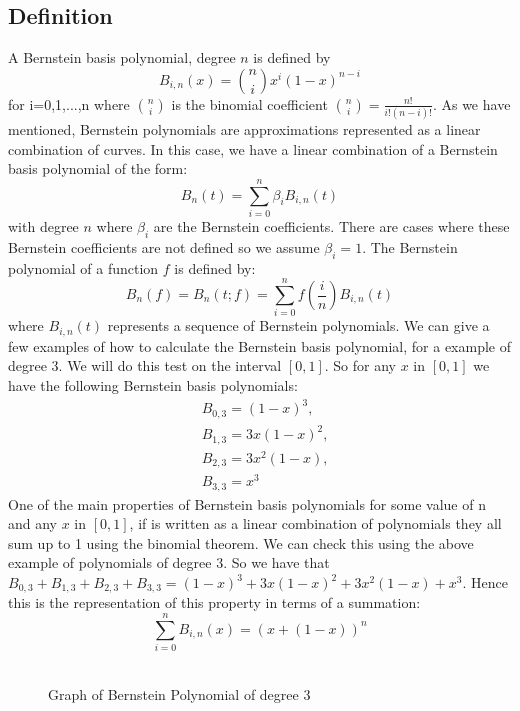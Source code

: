 \documentclass{article}
\begin{document}
\subsection{Definition}
A Bernstein basis polynomial, degree $n$ is defined by
\begin{equation}
 B_{i,n}(x)=\binom{n}{i}x^i(1-x)^{n-i} 
\end{equation}
for i=0,1,...,n where $\binom{n}{i}$ is the binomial coefficient $\binom{n}{i}=\frac{n!}{i!(n-i)!}$.
As we have mentioned, Bernstein polynomials are approximations represented as a linear combination of curves. In this case, we have a linear combination of a Bernstein basis polynomial of the form:
\begin{equation}
B_n(t)=\sum_{i=0}^{n}\beta_iB_{i,n}(t)
\end{equation}
with degree $n$ where $\beta_i$ are the Bernstein coefficients. There are cases where these Bernstein coefficients are not defined so we assume $\beta_i=1$. The Bernstein polynomial of a function $f$ is defined by:
\begin{equation}
B_n(f)=B_n(t;f)=\sum_{i=0}^nf(\frac{i}{n})B_{i,n}(t)   
\end{equation}
 where $B_{i,n}(t)$ represents a sequence of Bernstein polynomials.
We can give a few examples of how to calculate the Bernstein basis polynomial, for a example of degree $3$. We will do this test on the interval $[0,1]$. So for any $x$ in $[0,1]$ we have the following Bernstein basis polynomials:
\begin{align*}
 &B_{0,3}=(1-x)^3,\\   
&B_{1,3}=3x(1-x)^2,\\
&B_{2,3}=3x^2(1-x),\\
&B_{3,3}=x^3
\end{align*}
One of the main properties of Bernstein basis polynomials for some value of n and any $x$ in $[0,1]$, if is written as a linear combination of polynomials they all sum up to 1 using the binomial theorem. We can check this using the above example of polynomials of degree $3$. So we have that $B_{0,3}+B_{1,3}+B_{2,3}+B_{3,3}=(1-x)^3+3x(1-x)^2+3x^2(1-x)+x^3$.
Hence this is the representation of this property in terms of a summation:
\begin{equation}
\sum_{i=0}^nB_{i,n}(x)=(x+(1-x))^n    
\end{equation}
\begin{figure}[h]
    \centering
    \includegraphics[width=1pt, scale = 0.20]{BP.jpg}
    \caption{Graph of Bernstein Polynomial of degree $3$}
    \label{fig:2}
\end{figure}
\end{document}
